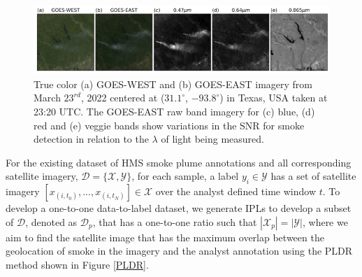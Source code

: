 \documentclass{article}
\begin{document}
\begin{figure}[!htb]
    \centering
    \includegraphics[width=\linewidth]{figures/GOES_WEST_EAST_B_R_V_small.png}
    \caption{True color (a) GOES-WEST and (b) GOES-EAST imagery from March \(23^{rd}\), 2022 centered at (\(31.1^{\circ}\), \(-93.8^{\circ}\)) in Texas, USA taken at 23:20 UTC. The GOES-EAST raw band imagery for (c) blue, (d) red and (e) veggie bands show variations in the SNR for smoke detection in relation to the \(\lambda\) of light being measured.}\label{WEST_EAST_bands}
\end{figure}

For the existing dataset of HMS smoke plume annotations and all corresponding satellite imagery, \(\mathcal{D} = \{\mathcal{X}, \mathcal{Y}\}\), for each sample, a label \(y_i \in \mathcal{Y}\) has a set of satellite imagery \([x_{(i,t_0)},...,x_{(i,t_N)}] \in \mathcal{X}\) over the analyst defined time window \(t\). To develop a one-to-one data-to-label dataset, we generate IPLs to develop a subset of \(\mathcal{D}\), denoted as \(\mathcal{D}_p\), that has a one-to-one ratio such that \(|\mathcal{X}_p| = |\mathcal{Y}|\), where we aim to find the satellite image that has the maximum overlap between the geolocation of smoke in the imagery and the analyst annotation using the PLDR method shown in Figure \ref{PLDR}.
\end{document}
